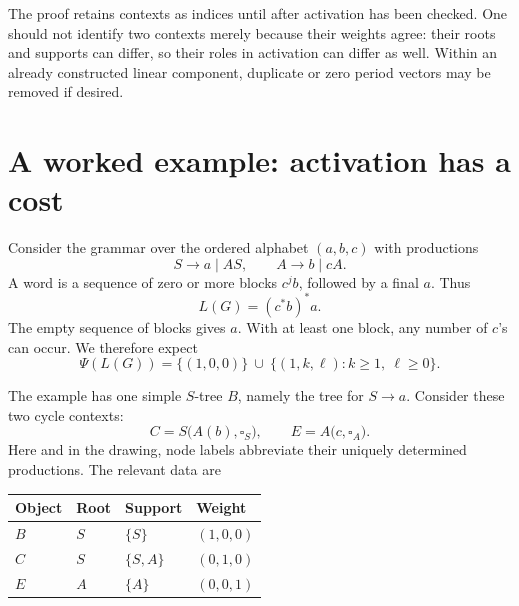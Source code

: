 \documentclass[11pt,a4paper]{article}
\numberwithin{equation}{section}
\theoremstyle{plain}
\theoremstyle{definition}
\theoremstyle{remark}
\newcommand{\hole}[1]{\square_{#1}}
\begin{document}
The proof retains contexts as indices until after activation has been checked. One should not identify two contexts merely because their weights agree: their roots and supports can differ, so their roles in activation can differ as well. Within an already constructed linear component, duplicate or zero period vectors may be removed if desired.

\section{A worked example: activation has a cost}\label{sec:example}

Consider the grammar over the ordered alphabet $(a,b,c)$ with productions
\[
S\to a\mid AS,\qquad A\to b\mid cA.
\]
A word is a sequence of zero or more blocks $c^j b$, followed by a final $a$. Thus
\[
L(G)=(c^*b)^*a.
\]
The empty sequence of blocks gives $a$. With at least one block, any number of $c$'s can occur. We therefore expect
\begin{equation}\label{eq:example-target}
\Psi(L(G))=\{(1,0,0)\}\ \cup\ \{(1,k,\ell):k\geq1,\ \ell\geq0\}.
\end{equation}

The example has one simple $S$-tree $B$, namely the tree for $S\to a$. Consider these two cycle contexts:
\[
C=S\bigl(A(b),\hole S\bigr),\qquad
E=A\bigl(c,\hole A\bigr).
\]
Here and in the drawing, node labels abbreviate their uniquely determined productions. The relevant data are
\begin{center}
\begin{tabular}{@{}llll@{}}
\toprule
Object & Root & Support & Weight\\
\midrule
$B$ & $S$ & $\{S\}$ & $(1,0,0)$\\
$C$ & $S$ & $\{S,A\}$ & $(0,1,0)$\\
$E$ & $A$ & $\{A\}$ & $(0,0,1)$\\
\bottomrule
\end{tabular}
\end{center}

\begin{center}
\end{center}
\end{document}
